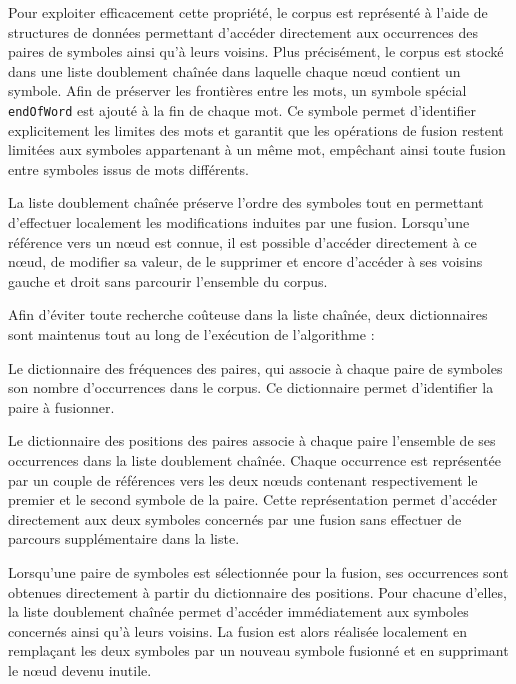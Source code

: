 \documentclass[12pt,a4paper]{report}
\begin{document}
	Pour exploiter efficacement cette propriété, le corpus est représenté à l’aide de structures de données permettant d’accéder directement aux occurrences des paires de symboles ainsi qu’à leurs voisins. Plus précisément, le corpus est stocké dans une liste doublement chaînée dans laquelle chaque nœud contient un symbole. Afin de préserver les frontières entre les mots, un symbole spécial \texttt{endOfWord} est ajouté à la fin de chaque mot. Ce symbole permet d’identifier explicitement les limites des mots et garantit que les opérations de fusion restent limitées aux symboles appartenant à un même mot, empêchant ainsi toute fusion entre symboles issus de mots différents.
	
	La liste doublement chaînée préserve l’ordre des symboles tout en permettant d’effectuer localement les modifications induites par une fusion. Lorsqu’une référence vers un nœud est connue, il est possible d’accéder directement à ce nœud, de modifier sa valeur, de le supprimer et encore d’accéder à ses voisins gauche et droit sans parcourir l’ensemble du corpus.
	
	Afin d’éviter toute recherche coûteuse dans la liste chaînée, deux dictionnaires sont maintenus tout au long de l’exécution de l’algorithme :
	
	\begin{itemizeFB}
		\item Le dictionnaire des fréquences des paires, qui associe à chaque paire de symboles son nombre d’occurrences dans le corpus. Ce dictionnaire permet d’identifier la paire à fusionner.
		
		\item Le dictionnaire des positions des paires associe à chaque paire l’ensemble de ses occurrences dans la liste doublement chaînée. Chaque occurrence est représentée par un couple de références vers les deux nœuds contenant respectivement le premier et le second symbole de la paire. Cette représentation permet d’accéder directement aux deux symboles concernés par une fusion sans effectuer de parcours supplémentaire dans la liste.
	\end{itemizeFB}
	
	Lorsqu’une paire de symboles est sélectionnée pour la fusion, ses occurrences sont obtenues directement à partir du dictionnaire des positions. Pour chacune d’elles, la liste doublement chaînée permet d’accéder immédiatement aux symboles concernés ainsi qu’à leurs voisins. La fusion est alors réalisée localement en remplaçant les deux symboles par un nouveau symbole fusionné et en supprimant le nœud devenu inutile.
	
\end{document}
